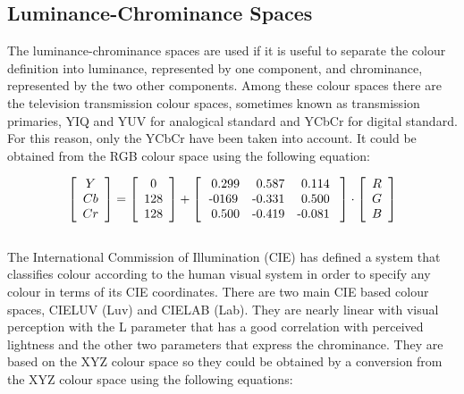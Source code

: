 \documentclass[final,a4paper,12pt,english]{UnicaPhdThesis3}
\begin{document}
\subsection{Luminance-Chrominance Spaces}  %
The luminance-chrominance spaces are used if it is useful to separate the colour definition into luminance, represented by one component, and chrominance, represented by the two other components. Among these colour spaces there are the television transmission colour spaces, sometimes known as transmission primaries, YIQ and YUV for analogical standard and YCbCr for digital standard. For this reason, only the YCbCr have been taken into account. It could be obtained from the RGB colour space using the following equation:

\begin{equation}\label{Ycbcr}
\left [ {  \begin{array}{c} Y  \\ Cb   \\ Cr \end{array} } \right ] = \left [{ \begin{array}{c} 0  \\ 128   \\ 128  \end{array} } \right ] +
\left [ { \begin{array}{c c c} \mbox{ 0.299}  & \mbox{ 0.587} & \mbox{ 0.114 } \\ \mbox{-0169} & \mbox{-0.331} & \mbox{ 0.500 } \\ \mbox{ 0.500} & \mbox{-0.419} & \mbox{-0.081 }  \end{array} } \right ] \cdot \left [ { \begin{array}{c} R  \\ G  \\ B  \end{array} } \right ] 
\end{equation}
\\
The International Commission of Illumination (CIE) has defined a system that classifies colour according to the human visual system in order to specify any colour in terms of its CIE coordinates. There are two main CIE based colour spaces, CIELUV (Luv) and CIELAB (Lab). They are nearly linear with visual perception with the L parameter that has a good correlation with perceived lightness and the other two parameters that express the chrominance. They are based on the XYZ colour space so they could be obtained by a conversion from the XYZ colour space using the following equations:
\end{document}

